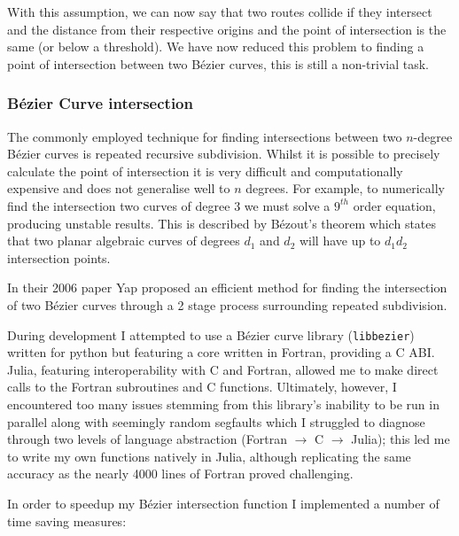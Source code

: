 With this assumption, we can now say that two routes collide if they intersect and the distance from their respective origins and the point of intersection is the same (or below a threshold). We have now reduced this problem to finding a point of intersection between two Bézier curves, this is still a non-trivial task.

\subsubsection{Bézier Curve intersection}
\label{subsec:approach:bezInt}

The commonly employed technique for finding intersections between two $n$-degree Bézier curves is repeated recursive subdivision. Whilst it is possible to precisely calculate the point of intersection it is very difficult and computationally expensive and does not generalise well to $n$ degrees. For example, to numerically find the intersection two curves of degree 3 we must solve a $9^{th}$ order equation, producing unstable results. This is described by Bézout's theorem which states that two planar algebraic curves of degrees $d_{1}$ and $d_{2}$ will have up to $d_{1}d_{2}$ intersection points.

In their 2006 paper Yap\cite{yapCompleteSubdivisionAlgorithms2006} proposed an efficient method for finding the intersection of two Bézier curves through a 2 stage process surrounding repeated subdivision.

During development I attempted to use a Bézier curve library (\texttt{libbezier})\cite{Hermes2017} written for python but featuring a core written in Fortran, providing a C ABI. Julia, featuring interoperability with C and Fortran, allowed me to make direct calls to the Fortran subroutines and C functions. Ultimately, however, I encountered too many issues stemming from this library's inability to be run in parallel along with seemingly random segfaults which I struggled to diagnose through two levels of language abstraction (Fortran $\rightarrow$ C $\rightarrow$ Julia); this led me to write my own functions natively in Julia, although replicating the same accuracy as the nearly 4000 lines of Fortran proved challenging.

In order to speedup my Bézier intersection function I implemented a number of time saving measures:

